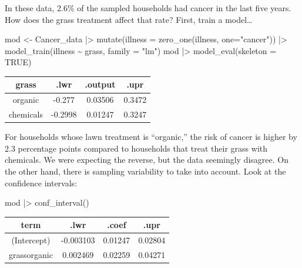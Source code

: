 \documentclass[
  letterpaper,
  DIV=11,
  numbers=noendperiod,
  oneside]{scrartcl}
\newenvironment{Shaded}{\begin{snugshade}}{\end{snugshade}}
\newcommand{\AttributeTok}[1]{\textcolor[rgb]{0.40,0.45,0.13}{#1}}
\newcommand{\ConstantTok}[1]{\textcolor[rgb]{0.56,0.35,0.01}{#1}}
\newcommand{\FunctionTok}[1]{\textcolor[rgb]{0.28,0.35,0.67}{#1}}
\newcommand{\NormalTok}[1]{\textcolor[rgb]{0.00,0.23,0.31}{#1}}
\newcommand{\OtherTok}[1]{\textcolor[rgb]{0.00,0.23,0.31}{#1}}
\newcommand{\SpecialCharTok}[1]{\textcolor[rgb]{0.37,0.37,0.37}{#1}}
\newcommand{\StringTok}[1]{\textcolor[rgb]{0.13,0.47,0.30}{#1}}
\begin{document}
In these data, 2.6\% of the sampled households had cancer in the last
five years. How does the grass treatment affect that rate? First, train
a model\ldots{}

\begin{Shaded}
\begin{Highlighting}[]
\NormalTok{mod }\OtherTok{\textless{}{-}}\NormalTok{ Cancer\_data }\SpecialCharTok{|\textgreater{}} 
  \FunctionTok{mutate}\NormalTok{(}\AttributeTok{illness =} \FunctionTok{zero\_one}\NormalTok{(illness, }\AttributeTok{one=}\StringTok{"cancer"}\NormalTok{)) }\SpecialCharTok{|\textgreater{}}
  \FunctionTok{model\_train}\NormalTok{(illness }\SpecialCharTok{\textasciitilde{}}\NormalTok{ grass, }\AttributeTok{family =} \StringTok{"lm"}\NormalTok{) }
\NormalTok{mod }\SpecialCharTok{|\textgreater{}} \FunctionTok{model\_eval}\NormalTok{(}\AttributeTok{skeleton =} \ConstantTok{TRUE}\NormalTok{)}
\end{Highlighting}
\end{Shaded}

\begin{longtable}[]{@{}cccc@{}}
\toprule\noalign{}
grass & .lwr & .output & .upr \\
\midrule\noalign{}
\endhead
\bottomrule\noalign{}
\endlastfoot
organic & -0.277 & 0.03506 & 0.3472 \\
chemicals & -0.2998 & 0.01247 & 0.3247 \\
\end{longtable}

For households whose lawn treatment is ``organic,'' the risk of cancer
is higher by 2.3 percentage points compared to households that treat
their grass with chemicals. We were expecting the reverse, but the data
seemingly disagree. On the other hand, there is sampling variability to
take into account. Look at the confidence intervals:

\begin{Shaded}
\begin{Highlighting}[]
\NormalTok{mod }\SpecialCharTok{|\textgreater{}} \FunctionTok{conf\_interval}\NormalTok{()}
\end{Highlighting}
\end{Shaded}

\begin{longtable}[]{@{}cccc@{}}
\toprule\noalign{}
term & .lwr & .coef & .upr \\
\midrule\noalign{}
\endhead
\bottomrule\noalign{}
\endlastfoot
(Intercept) & -0.003103 & 0.01247 & 0.02804 \\
grassorganic & 0.002469 & 0.02259 & 0.04271 \\
\end{longtable}
\end{document}

